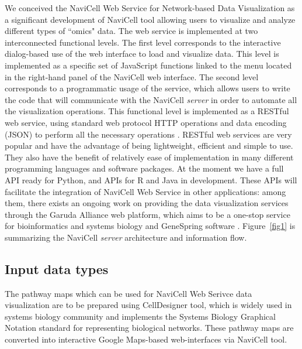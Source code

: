 \documentclass[a4,center,fleqn]{NAR}
\begin{document}
We conceived the NaviCell Web Service for Network-based Data Visualization
as a significant development of NaviCell tool \cite{kuperstein2013navicell} allowing
users to visualize and analyze different types of ``omics" data. The web service
is implemented at two interconnected functional levels.
The first level corresponds to the interactive dialog-based
use of the web interface to load and visualize data. This level is implemented
as a specific set of JavaScript functions linked to the menu located
in the right-hand panel of the NaviCell web interface. The second level corresponds to a
programmatic usage of the service, which allows users to write the code that will
communicate with the NaviCell \emph{server} in order to automate all the
visualization operations. This functional level is implemented as a RESTful web
service, using standard web protocol HTTP operations and data encoding (JSON)
to perform all the necessary operations \cite{fielding2002principled}.
RESTful web services are very popular and have the advantage of being
lightweight, efficient and simple to use. They also have the benefit of
relatively ease of implementation in many different programming languages and
software packages. At the moment we have a full API ready for Python, and
APIs for R and Java in development. These APIs will facilitate the
integration of NaviCell Web Service in other applications: among them, there exists an ongoing work on providing
the data visualization services through the Garuda Alliance web platform, which aims to be a one-stop service for
bioinformatics and systems biology \cite{ghosh2011software} and GeneSpring software \cite{Chu2001}. Figure~\ref{fig1} is
summarizing the NaviCell \emph{server} architecture and information flow.

\enlargethispage{-65.1pt}

\subsection{Input data types}

The pathway maps which can be used for NaviCell Web Serivce data visualization 
are to be prepared using CellDesigner tool\cite{Funahashi2008}, which is widely used in systems biology
community and implements the Systems Biology Graphical Notation standard \cite{LeNovere2009}
for representing biological networks. These pathway maps are converted into 
interactive Google Maps-based web-interfaces via NaviCell tool\cite{kuperstein2013navicell}.
\end{document}
